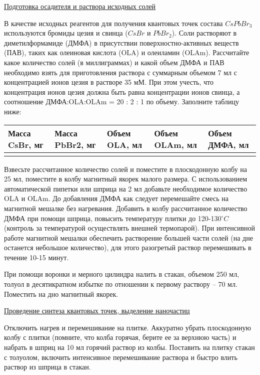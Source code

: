 \underline{Подготовка осадителя и раствора исходных солей}

В качестве исходных реагентов для получения квантовых точек состава $CsPbBr_3$ используются бромиды цезия и свинца ($CsBr$ и $PbBr_2$). Соли растворяют в диметилформамиде (ДМФА) в присутствии поверхностно-активных веществ (ПАВ), таких как олеиновая кислота (OLA) и олеиламин (OLAm). Рассчитайте какое количество солей (в миллиграммах) и какой объем ДМФА и ПАВ необходимо взять для приготовления раствора с суммарным объемом 7 мл с концентрацией ионов цезия в растворе 35 мМ. При этом учесть, что концентрация ионов цезия должна быть равна концентрации ионов свинца, а соотношение ДМФА:OLA:OLAm = 20 : 2 : 1 по объему. Заполните таблицу ниже:

\begin{table}[H]
    \begin{center}
        \begin{tabular}{|p{2.2cm}|p{2.2cm}|p{2.2cm}|p{2.2cm}|p{2.2cm}|}
            \hline
            Масса CsBr, мг	&Масса PbBr2, мг	&Объем OLA, мл&	Объем OLAm, мл	&Объем ДМФА, мл\\
            \hline
            & & & & \\
            \hline
        \end{tabular}
    \end{center}
\end{table}
    				
Взвесьте рассчитанное количество солей и поместите в плоскодонную колбу на 25 мл, поместите в колбу магнитный якорек малого размера. С использованием автоматической пипетки или шприца на 2 мл добавьте необходимое количество OLA и OLAm. До добавления ДМФА как следует перемешайте смесь на магнитной мешалке без нагревания. Добавить в колбу рассчитанное количество ДМФА при помощи шприца, повысить температуру плитки до 120-130$^\circ C$ (контроль за температурой осуществлять внешней термопарой). При интенсивной работе магнитной мешалки обеспечить растворение большей части солей (на дне останется небольшое количество), для этого разогретый раствор перемешивать в течение 10-15 минут.

При помощи воронки и мерного цилиндра налить в стакан, объемом 250 мл, толуол в десятикратном избытке по отношении к первому раствору – 70 мл. Поместить на дно магнитный якорек.

\underline{Проведение синтеза квантовых точек, выделение наночастиц}

Отключить нагрев и перемешивание на плитке. Аккуратно убрать плоскодонную колбу с плитки (помните, что колба горячая, берите ее за верхнюю часть) и набрать в шприц на 10 мл горячий раствор из колбы. Поставить на плитку стакан с толуолом, включить интенсивное перемешивание раствора и быстро влить раствор из шприца в стакан.

